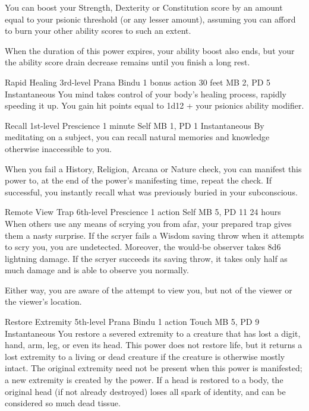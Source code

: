   You can boost your
  Strength, Dexterity or Constitution score by an
  amount equal to your psionic threshold
  (or any lesser amount),
  assuming you can afford to burn your other ability
  scores to such an extent.
  
  When the duration of this power expires,
  your ability boost also ends,
  but your the ability score drain decrease
  remains until you finish a long rest.

\DndPowerHeader%
  {Rapid Healing}
  {3rd-level Prana Bindu}
  {1 bonus action}
  {30 feet}
  {MB 2, PD 5}
  {Instantaneous}
You mind takes control of your body's healing process,
rapidly speeding it up.
You gain hit points equal to 1d12 + your psionics ability modifier.

\DndPowerHeader%
  {Recall}
  {1st-level Prescience}
  {1 minute}
  {Self}
  {MB 1, PD 1}
  {Instantaneous}
By meditating on a subject, you can recall
natural memories and knowledge otherwise inaccessible to you.

When you fail a History, Religion, Arcana or Nature check,
you can manifest this power to, at the end of the
power's manifesting time, repeat the check.
If successful, you instantly recall
what was previously buried in your subconscious.

\DndPowerHeader%
  {Remote View Trap}
  {6th-level Prescience}
  {1 action}
  {Self}
  {MB 5, PD 11}
  {24 hours}
  When others use any means of scrying you from afar,
  your prepared trap gives them a nasty surprise.
  If the scryer fails a Wisdom saving throw
  when it attempts to scry you,
  you are undetected.
  Moreover, the would-be observer takes 8d6 lightning damage.
  If the scryer succeeds its saving throw,
  it takes only half as much damage
  and is able to observe you normally.
  
  Either way, you are aware of the attempt to view you,
  but not of the viewer or the viewer's location.

\DndPowerHeader%
  {Restore Extremity}
  {5th-level Prana Bindu}
  {1 action}
  {Touch}
  {MB 5, PD 9}
  {Instantaneous}
  You restore a severed extremity to a creature that has
  lost a digit,
  hand,
  arm,
  leg,
  or even its head.
  This power does not restore life,
  but it returns a lost extremity to a living or dead creature
  if the creature is otherwise mostly intact.
  The original extremity need not be present
  when this power is manifested;
  a new extremity is created by the power.
  If a head is restored to a body,
  the original head (if not already destroyed)
  loses all spark of identity,
  and can be considered so much dead tissue.

